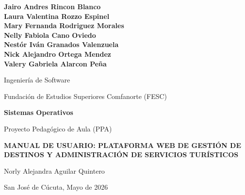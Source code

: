 \documentclass[12pt,letterpaper]{article}
\begin{document}
\begin{titlepage}
    \centering
    \vspace*{0.5in}

    {\normalsize\bfseries
    Jairo Andres Rincon Blanco \\
    Laura Valentina Rozzo Espinel\\
    Mary Fernanda Rodriguez Morales\\
    Nelly Fabiola Cano Oviedo\\
    Nestór Iván Granados Valenzuela\\
    Nick Alejandro Ortega Mendez\\
    Valery Gabriela Alarcon Peña\\
    \par}
    \vspace{0.6in}

    {\normalsize Ingeniería de Software \par}
    \vspace{0.4in}

    {\normalsize Fundación de Estudios Superiores Comfanorte (FESC) \par}
    \vspace{0.6in}

    {\normalsize\bfseries Sistemas Operativos \par}
    \vspace{0.4in}

    {\normalsize Proyecto Pedagógico de Aula (PPA) \par}
    \vspace{0.5in}
    {\normalsize\bfseries MANUAL DE USUARIO: PLATAFORMA WEB DE GESTIÓN DE DESTINOS Y ADMINISTRACIÓN DE SERVICIOS TURÍSTICOS\par}
    \vspace{0.6in}

    {\normalsize Norly Alejandra Aguilar Quintero \par}
    
    \vfill
    {\normalsize San José de Cúcuta, Mayo de 2026 \par}
\end{titlepage}
\end{document}
